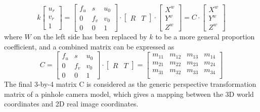 \begin{equation}
%
k \left[ \begin{array}{c} u_r \\ v_r \\ 1 \end{array} \right] %
=  \begin{bmatrix} f_u & s & u_0 \\ 0 & f_v & v_0 \\ 0 & 0 & 1 \end{bmatrix} \cdot%
\begin{bmatrix} R & T \end{bmatrix} \cdot \left[ \begin{array}{c} X^w \\ Y^w \\ Z^w \end{array} \right]%
=  C \cdot \left[ \begin{array}{c} X^w \\ Y^w \\ Z^w \end{array} \right]%
%
\end{equation}%
%
where \(W\) on the left side has been replaced by \(k\) to be a more general proportion coefficient, and a combined matrix can be expressed as
\begin{equation}
%
C %
=  \begin{bmatrix} f_u & s & u_0 \\ 0 & f_v & v_0 \\ 0 & 0 & 1 \end{bmatrix} \cdot%
\begin{bmatrix} R & T \end{bmatrix}%
= \begin{bmatrix} 
m_{11} & m_{12} & m_{13} & m_{14} \\
m_{21} & m_{22} & m_{23} & m_{24} \\
m_{31} & m_{32} & m_{33} & m_{34} \\
\end{bmatrix}%
%
\label{genericPerspectivePinholeMatrix}
\end{equation}%
%
The final 3-by-4 matrix C is considered as the generic perspective transformation matrix of a pinhole camera model, which gives a mapping between the 3D world coordinates and 2D real image coordinates.\par

